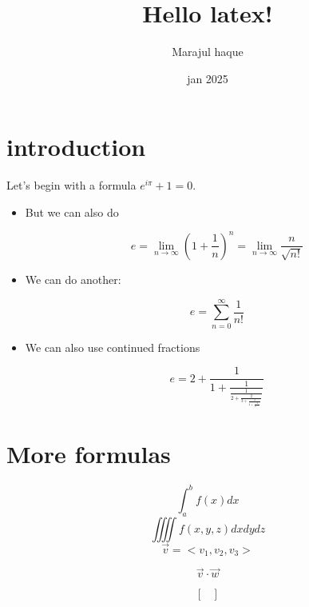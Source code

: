 \documentclass{article}
\title{Hello latex!}
\author{Marajul haque}
\date{jan 2025}
\begin{document}
	
	\maketitle
	
	\section*{introduction}
	
	Let's begin with a formula $e^{i\pi}+1=0$. 
	


\begin{itemize}
  
 

\item  But we can also do 
	
	$$  e=\lim_{n\to\infty}  \left(1+\frac{1}{n}\right)^n = \lim_{n\to\infty}\frac{n}{\sqrt{n!}}$$
	
\item We can do another:
	
	$$ e=\sum_{n=0}^{\infty} \frac{1}{n!} $$
	
	
 \item We can also use continued fractions
	
	$$ e=2+\frac{1}{1+\frac{1}{\frac{1}{2+\frac{2}{3+\frac{3}{4+\frac{4}{5+\ddots}}}}}}$$

    \end{itemize}
	
\section{More formulas}
	
	
	$$\int_a^bf(x)dx$$
	$$  \iiiint f(x,y,z)dxdydz	$$
	$$\vec{v}=<v_1, v_2, v_3>  $$
	
	$$\vec{v}\cdot\vec{w}$$
	
	$$\begin{bmatrix}
	
	
	
	\end{bmatrix}
$$	
	
	
	
	
\end{document}
